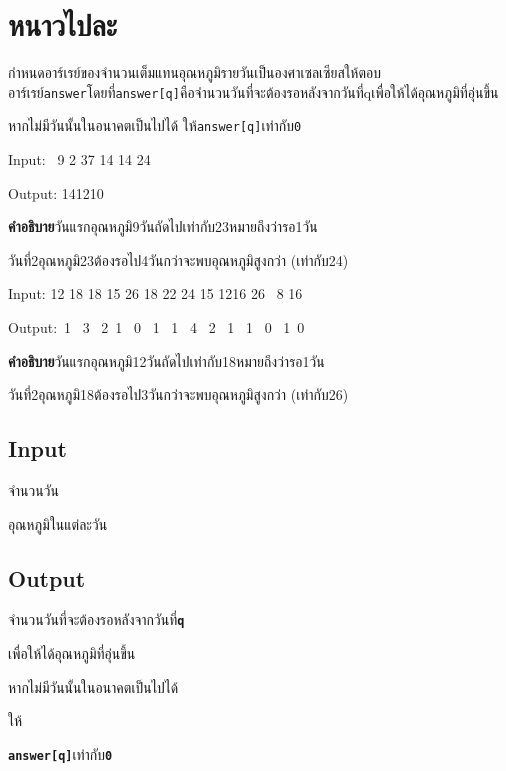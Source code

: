 \documentclass{article}
\begin{document}
\section*{หนาวไปละ}

กำหนดอาร์เรย์ของจำนวนเต็มแทนอุณหภูมิรายวันเป็นองศาเซลเซียสให้ตอบอาร์เรย์\texttt{answer}โดยที่\texttt{answer{[}q{]}}คือจำนวนวันที่จะต้องรอหลังจากวันที่qเพื่อให้ได้อุณหภูมิที่อุ่นขึ้น

หากไม่มีวันนั้นในอนาคตเป็นไปได้ ให้\texttt{answer{[}q{]}}เท่ากับ\texttt{0}



\hfill\break



Input: ~9 2 37 14 14 24



Output: 141210



\textbf{{คำอธิบาย}}วันแรกอุณหภูมิ9วันถัดไปเท่ากับ23หมายถึงว่ารอ1วัน



วันที่2อุณหภูมิ23ต้องรอไป4วันกว่าจะพบอุณหภูมิสูงกว่า (เท่ากับ24)



\hfill\break



Input: 12 18 18 15 26 18 22 24 15 1216 26 ~8 16



Output:~1 ~3 ~2~1 ~0 ~1 ~1 ~4 ~2 ~1 ~1 ~0 ~1~0



\textbf{{คำอธิบาย}}วันแรกอุณหภูมิ12วันถัดไปเท่ากับ18หมายถึงว่ารอ1วัน



วันที่2อุณหภูมิ18ต้องรอไป3วันกว่าจะพบอุณหภูมิสูงกว่า (เท่ากับ26)



\subsection*{Input}
จำนวนวัน



อุณหภูมิในแต่ละวัน



\subsection*{Output}
{จำนวนวันที่จะต้องรอหลังจากวันที่}{\textbf{\texttt{q}}}{เพื่อให้ได้อุณหภูมิที่อุ่นขึ้น

หากไม่มีวันนั้นในอนาคตเป็นไปได้

ให้\textbf{}}{\textbf{\texttt{a}}}{\textbf{\texttt{nswer{[}q{]}}}}{\textbf{}}{เท่ากับ}{\textbf{\texttt{0}}}{\textbf{}}\\
\end{document}
